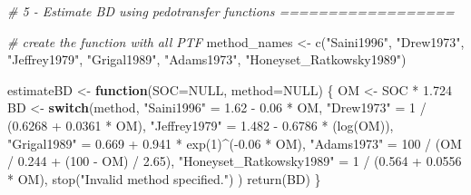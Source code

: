 \documentclass[
  10pt,
  b5paper,
  oneside]{book}
\newenvironment{Shaded}{\begin{snugshade}}{\end{snugshade}}
\newcommand{\AttributeTok}[1]{\textcolor[rgb]{0.77,0.63,0.00}{#1}}
\newcommand{\CommentTok}[1]{\textcolor[rgb]{0.56,0.35,0.01}{\textit{#1}}}
\newcommand{\ConstantTok}[1]{\textcolor[rgb]{0.00,0.00,0.00}{#1}}
\newcommand{\ControlFlowTok}[1]{\textcolor[rgb]{0.13,0.29,0.53}{\textbf{#1}}}
\newcommand{\DecValTok}[1]{\textcolor[rgb]{0.00,0.00,0.81}{#1}}
\newcommand{\FloatTok}[1]{\textcolor[rgb]{0.00,0.00,0.81}{#1}}
\newcommand{\FunctionTok}[1]{\textcolor[rgb]{0.00,0.00,0.00}{#1}}
\newcommand{\NormalTok}[1]{#1}
\newcommand{\OtherTok}[1]{\textcolor[rgb]{0.56,0.35,0.01}{#1}}
\newcommand{\SpecialCharTok}[1]{\textcolor[rgb]{0.00,0.00,0.00}{#1}}
\newcommand{\StringTok}[1]{\textcolor[rgb]{0.31,0.60,0.02}{#1}}
\begin{document}
\begin{Shaded}
\begin{Highlighting}[]
\CommentTok{\# 5 {-} Estimate BD using pedotransfer functions ==================}

\CommentTok{\# create the function with all PTF}
\NormalTok{method\_names }\OtherTok{\textless{}{-}} \FunctionTok{c}\NormalTok{(}\StringTok{"Saini1996"}\NormalTok{, }\StringTok{"Drew1973"}\NormalTok{, }\StringTok{"Jeffrey1979"}\NormalTok{, }
                  \StringTok{"Grigal1989"}\NormalTok{, }
                  \StringTok{"Adams1973"}\NormalTok{, }\StringTok{"Honeyset\_Ratkowsky1989"}\NormalTok{) }

\NormalTok{estimateBD }\OtherTok{\textless{}{-}} \ControlFlowTok{function}\NormalTok{(}\AttributeTok{SOC=}\ConstantTok{NULL}\NormalTok{, }\AttributeTok{method=}\ConstantTok{NULL}\NormalTok{) \{}
\NormalTok{  OM }\OtherTok{\textless{}{-}}\NormalTok{ SOC }\SpecialCharTok{*} \FloatTok{1.724}
\NormalTok{  BD }\OtherTok{\textless{}{-}} \ControlFlowTok{switch}\NormalTok{(method,}
           \StringTok{"Saini1996"} \OtherTok{=} \FloatTok{1.62} \SpecialCharTok{{-}} \FloatTok{0.06} \SpecialCharTok{*}\NormalTok{ OM,}
           \StringTok{"Drew1973"} \OtherTok{=} \DecValTok{1} \SpecialCharTok{/}\NormalTok{ (}\FloatTok{0.6268} \SpecialCharTok{+} \FloatTok{0.0361} \SpecialCharTok{*}\NormalTok{ OM),}
           \StringTok{"Jeffrey1979"} \OtherTok{=} \FloatTok{1.482} \SpecialCharTok{{-}} \FloatTok{0.6786} \SpecialCharTok{*}\NormalTok{ (}\FunctionTok{log}\NormalTok{(OM)),}
           \StringTok{"Grigal1989"} \OtherTok{=} \FloatTok{0.669} \SpecialCharTok{+} \FloatTok{0.941} \SpecialCharTok{*} \FunctionTok{exp}\NormalTok{(}\DecValTok{1}\NormalTok{)}\SpecialCharTok{\^{}}\NormalTok{(}\SpecialCharTok{{-}}\FloatTok{0.06} \SpecialCharTok{*}\NormalTok{ OM),}
           \StringTok{"Adams1973"} \OtherTok{=} \DecValTok{100} \SpecialCharTok{/}\NormalTok{ (OM }\SpecialCharTok{/} \FloatTok{0.244} \SpecialCharTok{+}\NormalTok{ (}\DecValTok{100} \SpecialCharTok{{-}}\NormalTok{ OM) }\SpecialCharTok{/} \FloatTok{2.65}\NormalTok{),}
           \StringTok{"Honeyset\_Ratkowsky1989"} \OtherTok{=} \DecValTok{1} \SpecialCharTok{/}\NormalTok{ (}\FloatTok{0.564} \SpecialCharTok{+} \FloatTok{0.0556} \SpecialCharTok{*}\NormalTok{ OM),}
           \FunctionTok{stop}\NormalTok{(}\StringTok{"Invalid method specified."}\NormalTok{)}
\NormalTok{  )}
  \FunctionTok{return}\NormalTok{(BD)}
\NormalTok{\}}
\end{Highlighting}
\end{Shaded}
\end{document}
